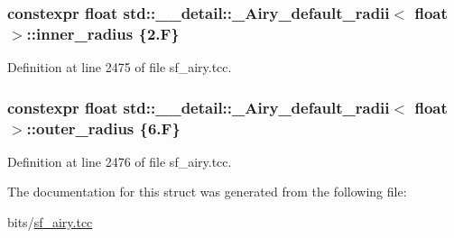 \subsubsection[{\texorpdfstring{inner\+\_\+radius}{inner_radius}}]{\setlength{\rightskip}{0pt plus 5cm}constexpr float {\bf std\+::\+\_\+\+\_\+detail\+::\+\_\+\+Airy\+\_\+default\+\_\+radii}$<$ float $>$\+::inner\+\_\+radius \{2.\+F\}\hspace{0.3cm}{\ttfamily [static]}}\hypertarget{structstd_1_1____detail_1_1__Airy__default__radii_3_01float_01_4_a798f4ff51a7e6a7dc5d0e5a670899c3a}{}\label{structstd_1_1____detail_1_1__Airy__default__radii_3_01float_01_4_a798f4ff51a7e6a7dc5d0e5a670899c3a}


Definition at line 2475 of file sf\+\_\+airy.\+tcc.

\subsubsection[{\texorpdfstring{outer\+\_\+radius}{outer_radius}}]{\setlength{\rightskip}{0pt plus 5cm}constexpr float {\bf std\+::\+\_\+\+\_\+detail\+::\+\_\+\+Airy\+\_\+default\+\_\+radii}$<$ float $>$\+::outer\+\_\+radius \{6.\+F\}\hspace{0.3cm}{\ttfamily [static]}}\hypertarget{structstd_1_1____detail_1_1__Airy__default__radii_3_01float_01_4_ad8ea3a344f9748cf9bf32bcc17ca5d0b}{}\label{structstd_1_1____detail_1_1__Airy__default__radii_3_01float_01_4_ad8ea3a344f9748cf9bf32bcc17ca5d0b}


Definition at line 2476 of file sf\+\_\+airy.\+tcc.



The documentation for this struct was generated from the following file\+:\begin{DoxyCompactItemize}
\item 
bits/\hyperlink{sf__airy_8tcc}{sf\+\_\+airy.\+tcc}\end{DoxyCompactItemize}

